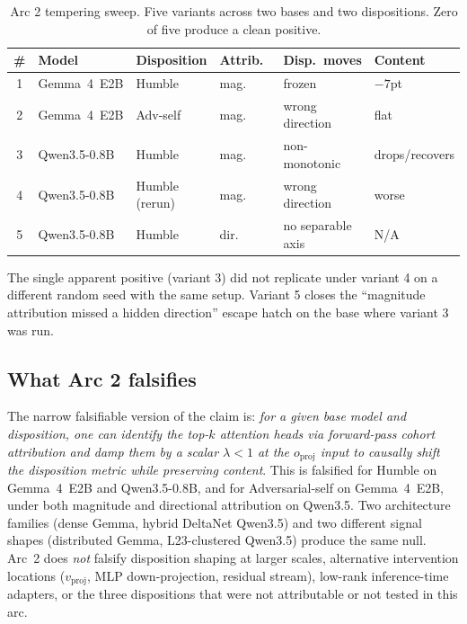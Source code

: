 \documentclass[11pt,a4paper]{article}
\begin{document}
\begin{table}[h]
\centering
\small
\caption{Arc 2 tempering sweep. Five variants across two bases and two dispositions. Zero of five produce a clean positive.}
\label{tab:arc2}
\begin{tabular}{clllll}
\toprule
\# & Model & Disposition & Attrib.\ & Disp.\ moves & Content \\
\midrule
1 & Gemma~4~E2B  & Humble           & mag.   & frozen              & $-7$pt  \\
2 & Gemma~4~E2B  & Adv-self         & mag.   & wrong direction     & flat   \\
3 & Qwen3.5-0.8B & Humble           & mag.   & non-monotonic       & drops/recovers \\
4 & Qwen3.5-0.8B & Humble (rerun)   & mag.   & wrong direction     & worse  \\
5 & Qwen3.5-0.8B & Humble           & dir.   & no separable axis   & N/A    \\
\bottomrule
\end{tabular}
\end{table}

The single apparent positive (variant 3) did not replicate under variant 4 on a different random seed with the same setup. Variant 5 closes the ``magnitude attribution missed a hidden direction'' escape hatch on the base where variant 3 was run.

\subsection{What Arc 2 falsifies}

The narrow falsifiable version of the claim is: \emph{for a given base model and disposition, one can identify the top-$k$ attention heads via forward-pass cohort attribution and damp them by a scalar $\lambda{<}1$ at the $o_{\text{proj}}$ input to causally shift the disposition metric while preserving content}. This is falsified for Humble on Gemma~4~E2B and Qwen3.5-0.8B, and for Adversarial-self on Gemma~4~E2B, under both magnitude and directional attribution on Qwen3.5. Two architecture families (dense Gemma, hybrid DeltaNet Qwen3.5) and two different signal shapes (distributed Gemma, L23-clustered Qwen3.5) produce the same null. Arc~2 does \emph{not} falsify disposition shaping at larger scales, alternative intervention locations ($v_{\text{proj}}$, MLP down-projection, residual stream), low-rank inference-time adapters, or the three dispositions that were not attributable or not tested in this arc.
\end{document}
